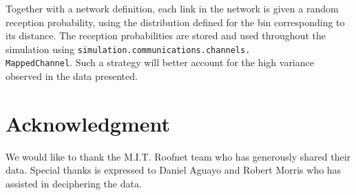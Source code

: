 \documentclass[11pt,twocolumn]{article}
\begin{document}
Together with a network definition, each link in the network is given a random reception probability, using the distribution defined for the bin corresponding to its distance.  The reception probabilities are stored and used throughout the simulation using {\small\texttt{simulation.communications.channels.\\MappedChannel}}.  Such a strategy will better account for the high variance observed in the data presented.

\section*{Acknowledgment}
We would like to thank the M.I.T. Roofnet team who has generously shared their data.  Special thanks is expressed to Daniel Aguayo and Robert Morris who has assisted in deciphering the data.



\end{document}

